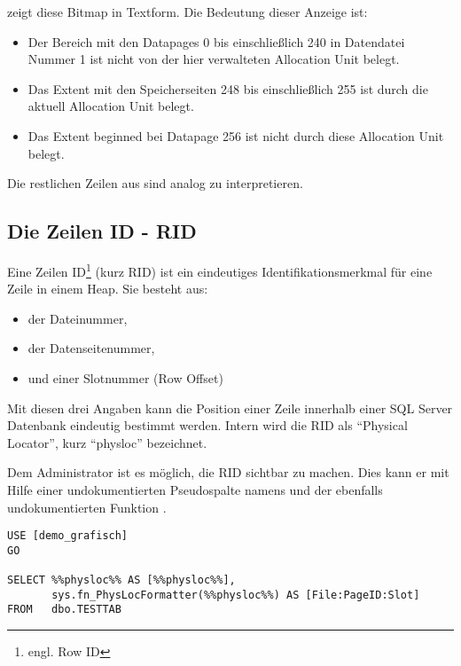          zeigt diese Bitmap in Textform. Die Bedeutung
        dieser Anzeige ist:
        \begin{itemize}
          \item Der Bereich mit den Datapages 0 bis einschließlich 240 in
          Datendatei Nummer 1 ist nicht von der hier verwalteten Allocation
          Unit belegt.
          \item Das Extent mit den Speicherseiten 248 bis einschließlich 255
          ist durch die aktuell Allocation Unit belegt.
          \item Das Extent beginned bei Datapage 256 ist nicht durch diese
          Allocation Unit belegt.
        \end{itemize}
        Die restlichen Zeilen aus  sind analog zu
        interpretieren.
        \begin{literaturinternet}
          \item \cite{sqlityTIAMLSWwt}
          \item \cite{ms187501}
          \item \cite{ms188270}
        \end{literaturinternet}
      \subsection{Die Zeilen ID - RID}
        Eine Zeilen ID\footnote{engl. Row ID} (kurz RID) ist ein eindeutiges
        Identifikationsmerkmal für eine Zeile in einem Heap. Sie besteht aus:
        \begin{itemize}
            \item der Dateinummer,
            \item der Datenseitenummer,
            \item und einer Slotnummer (Row Offset)
        \end{itemize}
        Mit diesen drei Angaben kann die Position einer Zeile innerhalb einer
        SQL Server Datenbank eindeutig bestimmt werden. Intern wird die RID
        als \enquote{Physical Locator}, kurz \enquote{physloc} bezeichnet.
        
        Dem Administrator ist es möglich, die RID sichtbar zu machen. Dies kann
        er mit Hilfe einer undokumentierten Pseudospalte namens
         und der ebenfalls undokumentierten
        Funktion .
        \begin{lstlisting}[language=ms_sql, caption={Auslesen der RID},
        label=admin05_03]
USE [demo_grafisch]
GO

SELECT %%physloc%% AS [%%physloc%%],
       sys.fn_PhysLocFormatter(%%physloc%%) AS [File:PageID:Slot]
FROM   dbo.TESTTAB          
        \end{lstlisting}
        \begin{literaturinternet}
          \item \cite{stovfl909155}
          \item \cite{hh213609}
        \end{literaturinternet}

